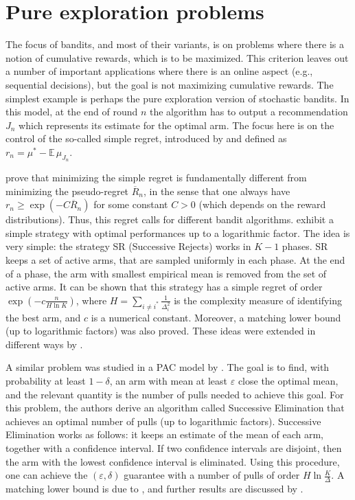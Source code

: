 \documentclass[11pt]{hackednow}
\newcommand{\E}{\mathbb{E}}
\newcommand{\oR}{\overline{R}}
\renewcommand{\epsilon}{\varepsilon}
\begin{document}
\section{Pure exploration problems}
The focus of bandits, and most of their variants, is on problems where there is a notion of cumulative rewards, which is to be maximized. This criterion leaves out a number of important applications where there is an online aspect (e.g., sequential decisions), but the goal is not maximizing cumulative rewards. The simplest example is perhaps the pure exploration version of stochastic bandits. In this model, at the end of round $n$ the algorithm has to output a recommendation $J_n$ which represents its estimate for the optimal arm. The focus here is on the control of the so-called simple regret, introduced by \cite{BMS09, BMS11} and defined as $r_n = \mu^* - \E\,\mu_{J_n}$.

\cite{BMS09} prove that minimizing the simple regret is fundamentally different from minimizing the pseudo-regret $\oR_n$, in the sense that one always have $r_n \geq \exp(- C \oR_n)$ for some constant $C>0$ (which depends on the reward distributions). Thus, this regret calls for different bandit algorithms. \cite{ABM10} exhibit a simple strategy with optimal performances up to a logarithmic factor. The idea is very simple: the strategy SR (Successive Rejects) works in $K-1$ phases. SR keeps a set of active arms, that are sampled uniformly in each phase. At the end of a phase, the arm with smallest empirical mean is removed from the set of active arms. It can be shown that this strategy has a simple regret of order $\exp\left(- c \frac{n}{H \ln K}\right)$, where $H = \sum_{i \neq i^*} \frac{1}{\Delta_i^2}$ is the complexity measure of identifying the best arm, and $c$ is a numerical constant. Moreover, a matching lower bound (up to logarithmic factors) was also proved. These ideas were extended in different ways by \cite{GGLB11, BJM11, BWV12}.

A similar problem was studied in a PAC model by \cite{EMM02}. The goal is to find, with probability at least $1-\delta$, an arm with mean at least $\epsilon$ close the optimal mean, and the relevant quantity is the number of pulls needed to achieve this goal. For this problem, the authors derive an algorithm called Successive Elimination that achieves an optimal number of pulls (up to logarithmic factors). Successive Elimination works as follows: it keeps an estimate of the mean of each arm, together with a confidence interval. If two confidence intervals are disjoint, then the arm with the lowest confidence interval is eliminated. Using this procedure, one can achieve the $(\epsilon, \delta)$ guarantee with a number of pulls of order $H \ln \tfrac{K}{\Delta}$. A matching lower bound is due to \cite{MT04}, and further results are discussed by \cite{EMM06}.
\end{document}

